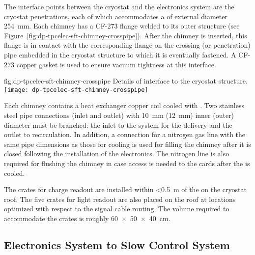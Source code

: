 The interface points between the cryostat and the \dual electronics system %
are the cryostat penetrations, each of which %
accommodates a %
 of external diameter \SI{254}{\mm}. Each chimney has a CF-273 flange welded to its outer structure (see Figure~\ref{fig:dp-tpcelec-sft-chimney-crosspipe}). After the chimney is inserted, this flange is in contact with the corresponding flange on the crossing (or penetration) pipe embedded in the cryostat structure to which it is eventually fastened. %
A CF-273 copper gasket is used to ensure vacuum tightness at this interface.  

\begin{dunefigure}{fig:dp-tpcelec-sft-chimney-crosspipe}
{Details of  interface to the cryostat structure.}
\texttt{[image: dp-tpcelec-sft-chimney-crosspipe]}
\end{dunefigure}

Each chimney contains a heat exchanger copper coil cooled with \lar. Two stainless steel pipe connections (inlet and outlet) with \SI{10}{\mm} (\SI{12}{\mm}) inner (outer) diameter must be branched: the inlet to the system for the \lar delivery and the outlet to recirculation. In addition, a connection for a nitrogen gas line with the same pipe dimensions as those for \lar cooling is used for filling the chimney after it is closed following the installation of the  electronics. The nitrogen line is also required for flushing the chimney in case access is needed to the  cards after the  is cooled. %

The  crates for charge readout are installed within \SI{<0.5}{\meter} of the  on %
the cryostat roof. The five  crates for light readout are also placed on the roof %
at %
locations optimized with respect to %
the  signal cable routing. The volume required  to accommodate the crates is roughly \SI[product-units=power]{60x50x40}{\cm}. 

\subsection{Electronics System to Slow Control System}
\label{ssec:dp-tpcelec-intfc-sc}

